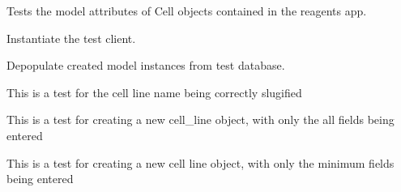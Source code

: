 \documentclass[letterpaper,10pt,english]{sphinxmanual}
\begin{document}

\begin{fulllineitems}
\label{api:experimentdb.reagents.tests.CellModelTests}
Tests the model attributes of Cell objects contained in the reagents app.


\begin{fulllineitems}
\label{api:experimentdb.reagents.tests.CellModelTests.setUp}
Instantiate the test client.


\end{fulllineitems}


\begin{fulllineitems}
\label{api:experimentdb.reagents.tests.CellModelTests.tearDown}
Depopulate created model instances from test database.


\end{fulllineitems}


\begin{fulllineitems}
\label{api:experimentdb.reagents.tests.CellModelTests.test_cell_line_slugify}
This is a test for the cell line name being correctly slugified


\end{fulllineitems}


\begin{fulllineitems}
\label{api:experimentdb.reagents.tests.CellModelTests.test_create_cell_line_all_fields}
This is a test for creating a new cell\_line object, with only the all fields being entered


\end{fulllineitems}


\begin{fulllineitems}
\label{api:experimentdb.reagents.tests.CellModelTests.test_create_cell_line_minimal}
This is a test for creating a new cell line object, with only the minimum fields being entered


\end{fulllineitems}


\end{fulllineitems}
\end{document}
